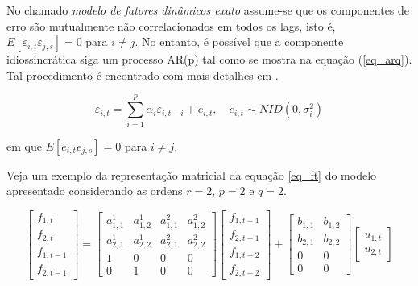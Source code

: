 \documentclass{article}
\begin{document}
No chamado \textit{modelo de fatores dinâmicos exato} assume-se que os componentes de erro são mutualmente não correlacionados em todos os lags, isto é, $E[\varepsilon_{i,t} \varepsilon_{j,s}] = 0$ para $i \neq j$. No entanto, é possível que a componente idiossincrática siga um processo AR(p) tal como se mostra na equação (\ref{eq_arq}). Tal procedimento é encontrado com mais detalhes em \cite{banburaetal2011}.

\begin{equation}\label{eq_arq}
\varepsilon_{i,t} = \sum_{i=1}^{p} \alpha_i \varepsilon_{i,t-i} + e_{i,t}, \quad e_{i,t} \sim NID(0,\sigma^2_i)
\end{equation}

em que $E[e_{i,t} e_{j,s}] = 0$ para $i \neq j$.



Veja um exemplo da representação matricial da equação \ref{eq_ft} do modelo apresentado considerando as ordens $r = 2$, $p = 2$ e $q = 2$.


\begin{equation}
\begin{bmatrix}
f_{1,t}\\
f_{2,t}\\
f_{1,t-1}\\
f_{2,t-1}
\end{bmatrix}
=
\begin{bmatrix}
a^1_{1,1} & a^1_{1,2} & a^2_{1,1} & a^2_{1,2} \\
a^1_{2,1} & a^1_{2,2} & a^2_{2,1} & a^2_{2,2} \\
1 & 0 & 0 & 0 \\
0 & 1 & 0 & 0
\end{bmatrix}
\begin{bmatrix}
f_{1,t-1}\\
f_{2,t-1}\\
f_{1,t-2}\\
f_{2,t-2}
\end{bmatrix}
+
\begin{bmatrix}
b_{1,1} & b_{1,2}\\
b_{2,1} & b_{2,2}\\
0 & 0\\
0 & 0
\end{bmatrix}
\begin{bmatrix}
u_{1,t}\\
u_{2,t}
\end{bmatrix}
\end{equation}

\end{document}
